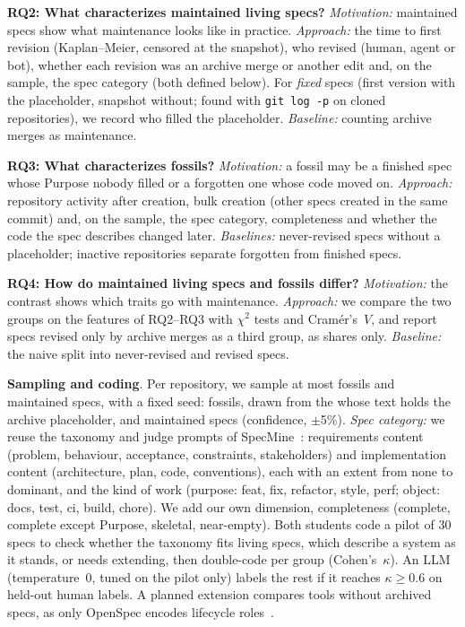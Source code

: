 \documentclass[10pt, conference]{IEEEtran}
\renewcommand{\paragraph}[1]{\noindent\textbf{#1}.}
\begin{document}
\textbf{RQ2: What characterizes maintained living specs?} \emph{Motivation:}
maintained specs show what maintenance looks like in practice.
\emph{Approach:} the time to first revision (Kaplan--Meier, censored at the
snapshot), who revised (human, agent or bot), whether each revision was an archive
merge or another edit and, on the sample, the spec category (both defined below). For \emph{fixed} specs (first
version with the placeholder, snapshot without; found with \texttt{git log -p} on cloned
repositories), we record who filled the placeholder.
\emph{Baseline:} counting archive merges as maintenance.

\textbf{RQ3: What characterizes fossils?} \emph{Motivation:} a fossil may be a finished
spec whose Purpose nobody filled or a forgotten one whose code moved on.
\emph{Approach:} repository activity after creation, bulk creation (other specs
created in the same commit) and, on the sample, the spec category, completeness and
whether the code the spec describes changed later. \emph{Baselines:} never-revised specs
without a placeholder; inactive repositories separate forgotten from finished specs.

\textbf{RQ4: How do maintained living specs and fossils differ?} \emph{Motivation:}
the contrast shows which traits go with maintenance. \emph{Approach:} we compare
the two groups on the features of RQ2--RQ3 with $\chi^2$ tests and Cram\'er's~$V$, and
report specs revised only by archive merges as a third group, as shares only. \emph{Baseline:} the
naive split into never-revised and revised specs.

\paragraph{Sampling and coding} Per repository, we sample at most \numSampleCap fossils and \numSampleCap maintained
specs, with a fixed seed: \numSampleFossilsCoded fossils, drawn from the \numFossilsCodedPop
whose text holds the archive placeholder, and \numSampleEdited maintained specs
(\pctConfSample confidence, $\pm$5\%). \emph{Spec category:} we reuse
the taxonomy and judge prompts of SpecMine~\cite{specmine_paper}:
requirements content (problem, behaviour, acceptance, constraints, stakeholders) and
implementation content (architecture, plan, code, conventions), each with an extent from
none to dominant, and the kind of work (purpose: feat, fix, refactor, style, perf; object:
docs, test, ci, build, chore). We add our own dimension, completeness (complete,
complete except Purpose, skeletal, near-empty). Both students code a pilot of 30 specs to check
whether the taxonomy fits living specs, which describe a system as it stands, or needs
extending, then double-code \numDoublePerGroup per group (Cohen's~$\kappa$). An LLM (temperature~0, tuned
on the pilot only) labels the rest if it reaches $\kappa \geq 0.6$ on held-out human
labels. A planned extension compares tools without archived
specs, as only OpenSpec encodes lifecycle roles~\cite{specmine_paper}.
\end{document}
